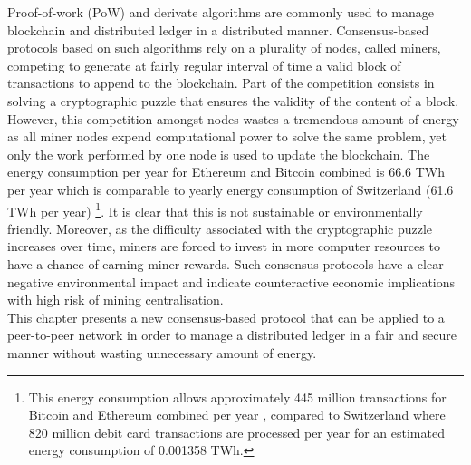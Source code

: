 Proof-of-work (PoW) and derivate algorithms are commonly used to manage blockchain and distributed ledger in a distributed manner. Consensus-based protocols based on such algorithms rely on a plurality of nodes, called miners, competing to generate at fairly regular interval of time a valid block of transactions to append to the blockchain. Part of the competition consists in solving a cryptographic puzzle that ensures the validity of the content of a block. \\

However, this competition amongst nodes wastes a tremendous amount of energy as all miner nodes expend computational power to solve the same problem, yet only the work performed by one node is used to update the blockchain. The energy consumption per year for Ethereum and Bitcoin combined is 66.6 TWh per year which is comparable to yearly energy consumption of Switzerland (61.6 TWh per year) \cite{electric}\footnote{This energy consumption allows approximately 445 million transactions for Bitcoin and Ethereum combined per year \cite{BitTxpD}\cite{EthTxpD}, compared to Switzerland where 820 million debit card transactions are processed per year \cite{swis} for an estimated energy consumption of 0.001358 TWh.}. It is clear that this is not sustainable or environmentally friendly. Moreover, as the difficulty associated with the cryptographic puzzle increases over time, miners are forced to invest in more computer resources to have a chance of earning miner rewards. Such consensus protocols have a clear negative environmental impact and indicate counteractive economic implications with high risk of mining centralisation. \\

This chapter presents a new consensus-based protocol that can be applied to a peer-to-peer network in order to manage a distributed ledger in a fair and secure manner without wasting unnecessary amount of energy. 